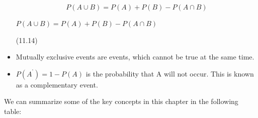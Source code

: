 \begin{itemize}[noitemsep]
{    \begin{equation}
    P\left(A\cup B\right)=P\left(A\right)+P\left(B\right)-P\left(A\cap B\right)\tag{11.14}
      \end{equation}
    }{%
    \setlength{\mymathboxwidth}{\columnwidth}
      \addtolength{\mymathboxwidth}{-48pt}
    \par\vspace{12pt}\noindent\begin{minipage}{\columnwidth}
    \parbox[t]{\mymathboxwidth}{\large$
    P\left(A\cup B\right)=P\left(A\right)+P\left(B\right)-P\left(A\cap B\right)$}\hfill
    \parbox[t]{48pt}{\raggedleft 
    (11.14)}
    \end{minipage}\vspace{12pt}\par
    }%
\item 
Mutually exclusive events are events, which cannot be true at the same
time.\item 
$P\left({A}^{\text{'}}\right)=1-P\left(A\right)$ is the probability that A will not occur. This is known as a
complementary event.\end{itemize}
        \label{m39373*eip-199}We can summarize some of the key concepts in this chapter in the following table:\par 
    \setlength\mytablespace{8\tabcolsep}
    \addtolength\mytablespace{5\arrayrulewidth}
    \setlength\mytablewidth{\linewidth}
